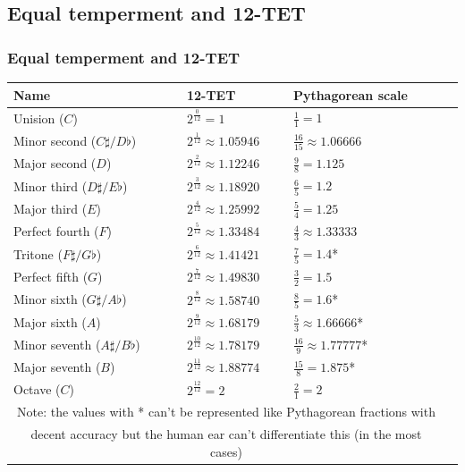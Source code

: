 \documentclass[12pt]{beamer}
\begin{document}
        \subsection{Equal temperment and 12-TET}
        \begin{frame}
            \frametitle{Equal temperment and 12-TET}
                \begin{center}
                    
                    {\tiny \begin{tabular}{| l | l | l | l |}
                        \hline
                        \textbf{Name} & \textbf{12-TET} & \textbf{Pythagorean scale}\\\hline
                        Unision ($C$) & $2^\frac{0}{12} = 1$ & $\frac{1}{1} = 1$ \\ \hline
                        Minor second ($C\sharp/D\flat$) & $2^\frac{1}{12} \approx 1.05946$ & $\frac{16}{15} \approx 1.06666$\\ \hline
                        Major second ($D$) & $2^\frac{2}{12} \approx 1.12246$ & $\frac{9}{8} = 1.125$ \\ \hline
                        Minor third ($D\sharp/E\flat$) & $2^\frac{3}{12} \approx 1.18920$ & $\frac{6}{5} = 1.2$ \\ \hline
                        Major third ($E$) & $2^\frac{4}{12} \approx 1.25992$ & $\frac{5}{4} = 1.25$ \\ \hline
                        Perfect fourth ($F$) & $2^\frac{5}{12} \approx 1.33484$ & $\frac{4}{3} \approx 1.33333$ \\ \hline
                        Tritone ($F\sharp/G\flat$) & $2^\frac{6}{12} \approx 1.41421$ & $\frac{7}{5} = 1.4$* \\ \hline
                        Perfect fifth ($G$) & $2^\frac{7}{12} \approx 1.49830$ & $\frac{3}{2} = 1.5$ \\ \hline
                        Minor sixth ($G\sharp/A\flat$) & $2^\frac{8}{12} \approx 1.58740$ & $\frac{8}{5} = 1.6$* \\ \hline
                        Major sixth ($A$) & $2^\frac{9}{12} \approx 1.68179$ & $\frac{5}{3} \approx 1.66666$* \\ \hline
                        Minor seventh ($A\sharp/B\flat$) & $2^\frac{10}{12} \approx 1.78179$ & $\frac{16}{9} \approx 1.77777$* \\ \hline
                        Major seventh ($B$) & $2^\frac{11}{12} \approx 1.88774$ & $\frac{15}{8} = 1.875$* \\ \hline
                        Octave ($C$) & $2^\frac{12}{12} = 2$ & $\frac{2}{1} = 2$ \\ \hline
                        \multicolumn{3}{c}{Note: the values with * can't be represented like Pythagorean fractions with}\\
                        \multicolumn{3}{c}{decent accuracy but the human ear can't differentiate this (in the most cases)}\\
                    \end{tabular}
                    }
                \end{center}
        \end{frame}
\end{document}

